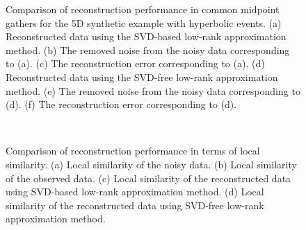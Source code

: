 \begin{figure}[htb!]
  \centering
   \caption{Comparison of reconstruction performance in common midpoint gathers for the 5D synthetic example with hyperbolic events. (a) Reconstructed data using the SVD-based low-rank approximation method. (b) The removed noise from the noisy data corresponding to (a). (c) The reconstruction error corresponding to (a). (d) Reconstructed data using the SVD-free low-rank approximation method. (e) The removed noise from the noisy data corresponding to (d). (f) The reconstruction error corresponding to (d).}
\label{fig:curve5d-svd-3d-1,curve5d-n-svd-3d-1,curve5d-r-svd-3d-1,curve5d-lmafit-3d-1,curve5d-n-lmafit-3d-1,curve5d-r-lmafit-3d-1}
\end{figure}

\begin{figure}[htb!]
  \centering
  \\
   \caption{Comparison of reconstruction performance in terms of local similarity. (a) Local similarity of the noisy data. (b) Local similarity of the observed data. (c) Local similarity of the reconstructed data using SVD-based low-rank approximation method. (d) Local similarity of the reconstructed data using SVD-free low-rank approximation method.}
\label{fig:simi-curve5d-noisy-3d-1,simi-curve5d-decimated-3d-1,simi-curve5d-svd-3d-1,simi-curve5d-lmafit-3d-1}
\end{figure}

